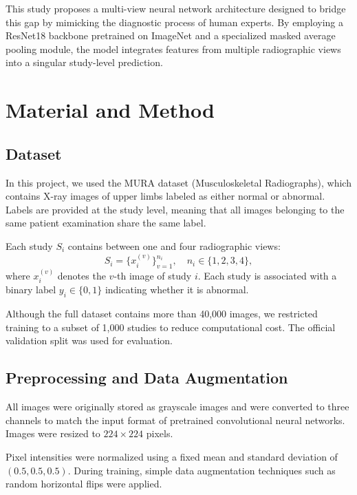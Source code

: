 \documentclass[conference]{IEEEtran}
\begin{document}
This study proposes a multi-view neural network architecture designed to bridge this gap by mimicking the diagnostic process of human experts. By employing a ResNet18 backbone pretrained on ImageNet\cite{he_deep_2016} and a specialized masked average pooling module, the model integrates features from multiple radiographic views into a singular study-level prediction.


\section{Material and Method}

\subsection{Dataset}

In this project, we used the MURA dataset (Musculoskeletal Radiographs), which contains X-ray images of upper limbs labeled as either normal or abnormal\cite{rajpurkar_mura_2018}. Labels are provided at the study level, meaning that all images belonging to the same patient examination share the same label.

Each study $S_i$ contains between one and four radiographic views:
\begin{equation}
S_i = \{ x_i^{(v)} \}_{v=1}^{n_i}, \quad n_i \in \{1,2,3,4\},
\end{equation}
where $x_i^{(v)}$ denotes the $v$-th image of study $i$. Each study is associated with a binary label $y_i \in \{0,1\}$ indicating whether it is abnormal.

Although the full dataset contains more than 40,000 images, we restricted training to a subset of 1,000 studies to reduce computational cost. The official validation split was used for evaluation.

\subsection{Preprocessing and Data Augmentation}

All images were originally stored as grayscale images and were converted to three channels to match the input format of pretrained convolutional neural networks. Images were resized to $224 \times 224$ pixels.

Pixel intensities were normalized using a fixed mean and standard deviation of $(0.5, 0.5, 0.5)$. During training, simple data augmentation techniques such as random horizontal flips were applied.
\end{document}
